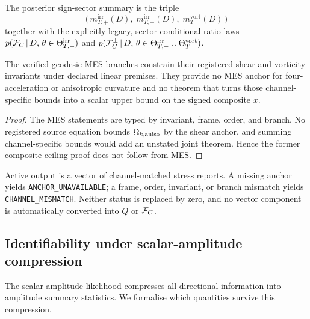 The posterior sign-sector summary is the triple
\begin{equation}\label{eq:full-summary}
\bigl(\,
  m_{T,+}^{\mathrm{irr}}(D),\;
  m_{T,-}^{\mathrm{irr}}(D),\;
  m_T^{\mathrm{vort}}(D)\,\bigr)
\end{equation}
together with the explicitly legacy, sector-conditional ratio laws
$p(\mathcal{F}_C \,|\, D,\,\theta \in \Theta_{T,+}^{\mathrm{irr}})$ and
$p(\mathcal{F}_C^{\pm} \,|\, D,\,\theta \in \Theta_{T,-}^{\mathrm{irr}}
\cup \Theta_T^{\mathrm{vort}})$.

\begin{proposition}
\label{prop:ceiling-existence}
The verified geodesic MES branches constrain their registered
shear and vorticity invariants under declared linear premises.
They provide no MES anchor for four-acceleration or anisotropic
curvature and no theorem that turns those channel-specific bounds
into a scalar upper bound on the signed composite $x$.
\end{proposition}

\begin{proof}
The MES statements are typed by invariant, frame, order, and
branch.  No registered source equation bounds $\Omega_{k,\mathrm{aniso}}$ by the
shear anchor, and summing channel-specific bounds would add an
unstated joint theorem.  Hence the former composite-ceiling proof
does not follow from MES.
\end{proof}

\begin{remark}
\label{rem:ceiling-scope}
Active output is a vector of channel-matched stress reports.  A
missing anchor yields \texttt{ANCHOR\_UNAVAILABLE}; a frame,
order, invariant, or branch mismatch yields
\texttt{CHANNEL\_MISMATCH}.  Neither status is replaced by zero,
and no vector component is automatically converted into $Q$ or
$\mathcal{F}_C$.
\end{remark}


\subsection{Identifiability under scalar-amplitude compression}
\label{sec:identifiability}

The scalar-amplitude likelihood compresses all directional
information into amplitude summary statistics.  We formalise
which quantities survive this compression.

